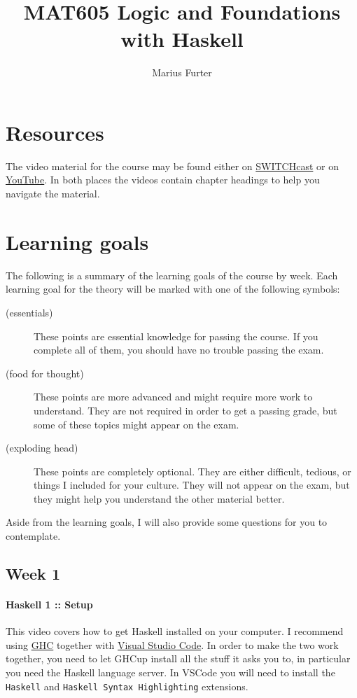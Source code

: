 \documentclass{article}[12pt]
\title{MAT605 Logic and Foundations with Haskell}
\author{Marius Furter}
\begin{document}
\setlength{\twemojiDefaultHeight}{1em}

\maketitle

\section{Resources}
The video material for the course may be found either on \href{https://uzh.mediaspace.cast.switch.ch/channel/23FS%2BMAT605%2BLogic%2Band%2BFoundations%2Bwith%2BHaskell/32019}{SWITCHcast} or on \href{https://www.youtube.com/watch?v=0HImO-me_sg&list=PLd8NbPjkXPliojM8YMN3z3o9--zXwti8Z}{YouTube}. In both places the videos contain chapter headings to help you navigate the material.

\section{Learning goals}
The following is a summary of the learning goals of the course by week. Each learning goal for the theory will be marked with one of the following symbols:
\begin{description}
    \item[ (essentials)] These points are essential knowledge for passing the course. If you complete all of them, you should have no trouble passing the exam.
    \item[ (food for thought)] These points are more advanced and might require more work to understand. They are not required in order to get a passing grade, but some of these topics might appear on the exam.
    \item[ (exploding head)] These points are completely optional. They are either difficult, tedious, or things I included for your culture. They will not appear on the exam, but they might help you understand the other material better.
\end{description}

Aside from the learning goals, I will also provide some questions for you to contemplate.

\subsection*{Week 1}

\paragraph{Haskell 1 :: Setup} This video covers how to get Haskell installed on your computer. I recommend using \href{https://www.haskell.org/ghcup/}{GHC} together with \href{https://code.visualstudio.com}{Visual Studio Code}. In order to make the two work together, you need to let GHCup install all the stuff it asks you to, in particular you need the Haskell language server. In VSCode you will need to install the \texttt{Haskell} and \texttt{Haskell Syntax Highlighting} extensions.
\end{document}
